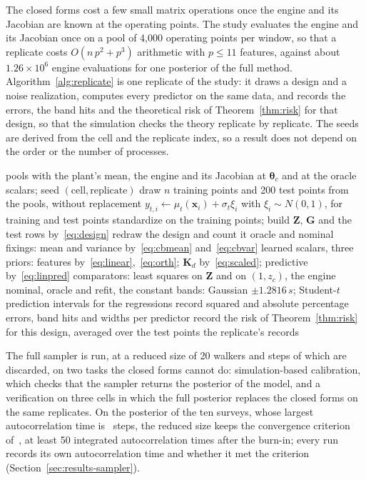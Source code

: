 The closed forms cost a few small matrix operations once the engine and its Jacobian are known at the operating points. The
study evaluates the engine and its Jacobian once on a pool of 4,000 operating points per window, so that a replicate costs
$O(n\,p^2+p^3)$ arithmetic with $p\le11$ features, against about $1.26\times10^6$ engine evaluations for one posterior of the
full method. Algorithm~\ref{alg:replicate} is one replicate of the study: it draws a design and a noise realization, computes
every predictor on the same data, and records the errors, the band hits and the theoretical risk of Theorem~\ref{thm:risk} for
that design, so that the simulation checks the theory replicate by replicate. The seeds are derived from the cell and the
replicate index, so a result does not depend on the order or the number of processes.

\begin{algorithm}[!t]
\caption{One replicate of a study cell: virtual plant $\mu_t$, noise $\sigma_t$, training window, test window, size $n$}
\label{alg:replicate}
\begin{algorithmic}[1]
\Require pools with the plant's mean, the engine and its Jacobian at $\boldsymbol\theta_c$ and at the oracle scalars; seed $(\text{cell},\text{replicate})$
\State draw $n$ training points and 200 test points from the pools, without replacement
\State $y_{t,i}\gets\mu_t(\mathbf x_i)+\sigma_t\xi_i$ with $\xi_i\sim N(0,1)$, for training and test points
\State standardize on the training points; build $\mathbf Z$, $\mathbf G$ and the test rows by~\eqref{eq:design}
 redraw the design and count it \EndIf
\State oracle and nominal fixings: mean and variance by~\eqref{eq:cbmean} and~\eqref{eq:cbvar}
\State learned scalars, three priors: features by~\eqref{eq:linear},~\eqref{eq:orth}; $\mathbf K_d$ by~\eqref{eq:scaled}; predictive by~\eqref{eq:linpred}
\State comparators: least squares on $\mathbf Z$ and on $(1,z_c)$, the engine nominal, oracle and refit, the constant
\State bands: Gaussian $\pm1.2816\,s$; Student-$t$ prediction intervals for the regressions
\State record squared and absolute percentage errors, band hits and widths per predictor
\State record the risk of Theorem~\ref{thm:risk} for this design, averaged over the test points
\State \Return the replicate's records
\end{algorithmic}
\end{algorithm}

The full sampler is run, at a reduced size of 20 walkers and \sbcSteps{} steps of which \sbcBurn{} are discarded, on two tasks the
closed forms cannot do: simulation-based calibration, which checks that the sampler returns the posterior of the model, and a
verification on three cells in which the full posterior replaces the closed forms on the same replicates. On the posterior of
the ten surveys, whose largest autocorrelation time is \tauTen~steps, the reduced size keeps the convergence criterion
of~\cite{cb002}, at least 50 integrated autocorrelation times after the burn-in; every run records its own autocorrelation
time and whether it met the criterion (Section~\ref{sec:results-sampler}).
